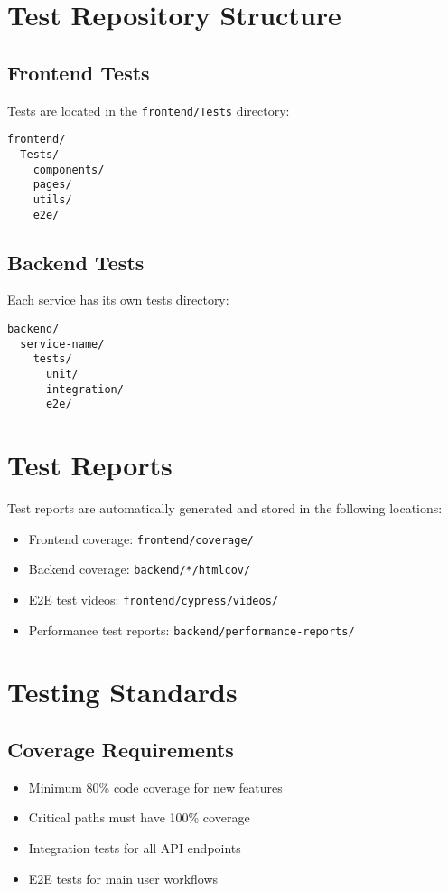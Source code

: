 \documentclass[12pt]{article}
\begin{document}
\section{Test Repository Structure}

\subsection{Frontend Tests}
Tests are located in the \texttt{frontend/Tests} directory:
\begin{lstlisting}[frame=single]
frontend/
  Tests/
    components/
    pages/
    utils/
    e2e/
\end{lstlisting}

\subsection{Backend Tests}
Each service has its own tests directory:
\begin{lstlisting}[frame=single]
backend/
  service-name/
    tests/
      unit/
      integration/
      e2e/
\end{lstlisting}

\section{Test Reports}
Test reports are automatically generated and stored in the following locations:

\begin{itemize}
    \item Frontend coverage: \texttt{frontend/coverage/}
    \item Backend coverage: \texttt{backend/*/htmlcov/}
    \item E2E test videos: \texttt{frontend/cypress/videos/}
    \item Performance test reports: \texttt{backend/performance-reports/}
\end{itemize}

\section{Testing Standards}

\subsection{Coverage Requirements}
\begin{itemize}
    \item Minimum 80\% code coverage for new features
    \item Critical paths must have 100\% coverage
    \item Integration tests for all API endpoints
    \item E2E tests for main user workflows
\end{itemize}
\end{document}
